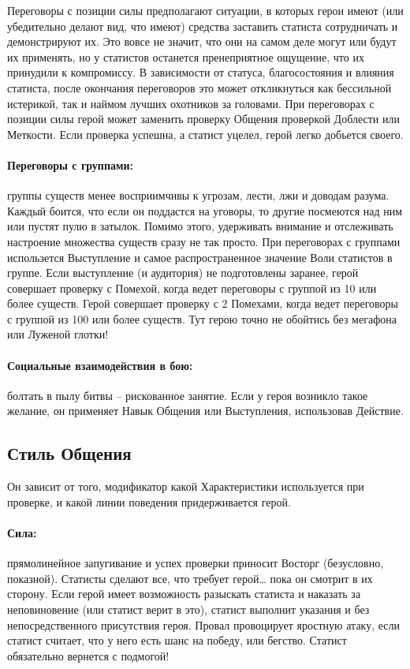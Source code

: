 Переговоры с позиции силы предполагают ситуации, в которых герои имеют (или убедительно делают вид, что имеют) средства заставить статиста сотрудничать и демонстрируют их. Это вовсе не значит, что они на самом деле могут или будут их применять, но у статистов останется пренеприятное ощущение, что их принудили к компромиссу. В зависимости от статуса, благосостояния и влияния статиста, после окончания переговоров это может откликнуться как бессильной истерикой, так и наймом лучших охотников за головами.
\newline При переговорах с позиции силы герой может заменить проверку Общения проверкой Доблести или Меткости. Если проверка успешна, а статист уцелел, герой легко добьется своего.
\paragraph{Переговоры с группами:} группы существ менее восприимчивы к угрозам, лести, лжи и доводам разума. Каждый боится, что если он поддастся на уговоры, то другие посмеются над ним или пустят пулю в затылок. Помимо этого, удерживать внимание и отслеживать настроение множества существ сразу не так просто. 
\newline При переговорах с группами использется Выступление и самое распространенное значение Воли статистов в группе. Если выступление (и аудитория) не подготовлены заранее, герой совершает проверку с Помехой, когда ведет переговоры с группой из 10 или более существ. Герой совершает проверку с 2 Помехами, когда ведет переговоры с группой из 100 или более существ. Тут герою точно не обойтись без мегафона или Луженой глотки!
\paragraph{Социальные взаимодействия в бою:} болтать в пылу битвы – рискованное занятие. Если у героя возникло такое желание, он применяет Навык Общения или Выступления, использовав Действие.

\subsection{Стиль Общения}
Он зависит от того, модификатор какой Характеристики используется при проверке, и какой линии поведения придерживается герой.
\paragraph{Сила:} прямолинейное запугивание и успех проверки приносит Восторг (безусловно, показной). Статисты сделают все, что требует герой… пока он смотрит в их сторону. Если герой имеет возможность разыскать статиста и наказать за неповиновение (или статист верит в это), статист выполнит указания и без непосредственного присутствия героя.
\newline Провал провоцирует яростную атаку, если статист считает, что у него есть шанс на победу, или бегство. Статист обязательно вернется с подмогой!
